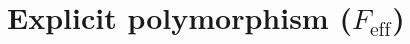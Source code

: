 \documentclass[preprint]{sigplanconf}
\newcommand{\lameff}{$\lambda_\mathrm{eff}$\xspace}
\newcommand{\feff}{$F_\textrm{eff}$\xspace}
\newcommand{\impeff}{Implicit \lameff}
\newcommand{\many}{\overline}
\newcommand{\sigentails}[1]{\mathbin{[{\text{\scriptsize ${#1}$}}]\!\text{-\!-}}\,}
\newcommand{\val}[3]  {#1 \vdash {#2} : {#3}}
\newcommand{\comp}[4]  {#1 \sigentails{#2} {#3} : {#4}}
\newcommand{\rt}[1]{\langle{#1}\rangle}   %
\newcommand{\valg}{\val{\Gamma}}
\newcommand{\compgs}{\comp{\Gamma}{\sigs}}
\newcommand{\sigs}{\Sigma}
\newcommand{\effbox}[1]{[#1]}
\newcommand{\key}[1]{\mathsf{#1}}
\newcommand{\handleSymbol}{\mathbin{?}}
\newcommand{\handle}[2]{{#1} \handleSymbol {#2}}
\newcommand{\thunk}[1]{\{{#1}\}}
\newcommand{\force}[1]{{#1}!}
\begin{document}








\section{Explicit polymorphism (\feff)}
\label{sec:feff}


\end{document}

